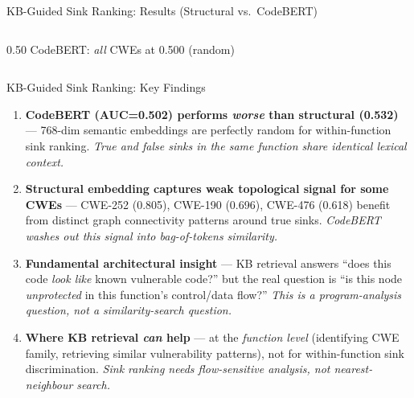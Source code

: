 \documentclass[aspectratio=169,10pt]{beamer}
\begin{document}
\begin{frame}{KB-Guided Sink Ranking: Results (Structural vs.\ CodeBERT)}
\begin{columns}[T]
\begin{column}{0.50\textwidth}
    \vspace{0.3em}
    {\scriptsize\textcolor{miss}{} CodeBERT: \emph{all} CWEs at 0.500 (random)}
  \end{column}
  \end{columns}

\end{frame}


\begin{frame}{KB-Guided Sink Ranking: Key Findings}
  \begin{enumerate}
    \item[\textcolor{miss}{\faIcon{chart-bar}}]
      \textbf{CodeBERT (AUC=0.502) performs \emph{worse} than structural (0.532)} —
      768-dim semantic embeddings are perfectly random for within-function sink ranking.
      \textit{True and false sinks in the same function share identical lexical context.}

    \vspace{0.3em}
    \item[\textcolor{hit}{\faIcon{lightbulb}}]
      \textbf{Structural embedding captures weak topological signal for some CWEs} —
      CWE-252 (0.805), CWE-190 (0.696), CWE-476 (0.618) benefit from
      distinct graph connectivity patterns around true sinks.
      \textit{CodeBERT washes out this signal into bag-of-tokens similarity.}

    \vspace{0.3em}
    \item[\textcolor{c1}{\faIcon{exclamation-triangle}}]
      \textbf{Fundamental architectural insight} — KB retrieval answers
      ``does this code \emph{look like} known vulnerable code?'' but the real question is
      ``is this node \emph{unprotected} in this function's control/data flow?''
      \textit{This is a program-analysis question, not a similarity-search question.}

    \vspace{0.3em}
    \item[\textcolor{c3}{\faIcon{arrow-right}}]
      \textbf{Where KB retrieval \emph{can} help} — at the \emph{function level}
      (identifying CWE family, retrieving similar vulnerability patterns),
      not for within-function sink discrimination.
      \textit{Sink ranking needs flow-sensitive analysis, not nearest-neighbour search.}
  \end{enumerate}
\end{frame}


\end{document}

